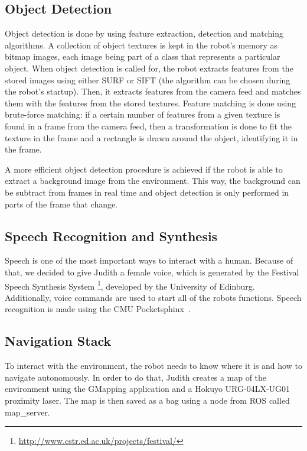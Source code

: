 \subsection{Object Detection}\label{object-detection}
Object detection is done by using feature extraction, detection and matching algorithms. A collection of object textures is kept in the robot's memory as bitmap images, each image being part of a class that represents a particular object. When object detection is called for, the robot extracts features from the stored images using either SURF \cite{bay_speeded-up_2008} or SIFT \cite{lowe_object_1999} (the algorithm can be chosen during the robot's startup). Then, it extracts features from the camera feed and matches them with the features from the stored textures. Feature matching is done using brute-force matching: if a certain number of features from a given texture is found in a frame from the camera feed, then a transformation is done to fit the texture in the frame and a rectangle is drawn around the object, identifying it in the frame.

A more efficient object detection procedure is achieved if the robot is able to extract a background image from the environment. This way, the background can be subtract from frames in real time and object detection is only performed in parts of the frame that change.

\subsection{Speech Recognition and Synthesis}\label{speech}
Speech is one of the most important ways to interact with a human. Because of that, we decided to give Judith a female voice, which is generated by the Festival Speech Synthesis System \footnote{\url{http://www.cstr.ed.ac.uk/projects/festival/}}, developed by the University of Edinburg. Additionally, voice commands are used to start all of the robots functions. Speech recognition is made using the CMU Pocketsphinx~\cite{huggins:2006}.

\subsection{Navigation Stack}\label{navigation}
To interact with the environment, the robot needs to know where it is and how to navigate autonomously. In order to do that, Judith creates a map of the environment using the GMapping application and a Hokuyo URG-04LX-UG01 proximity laser. The map is then saved as a bag using a node from ROS called map\_server.

